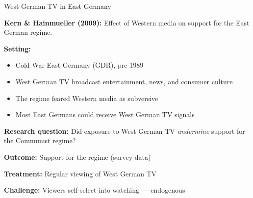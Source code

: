 \documentclass[aspectratio=169, handout]{beamer}
\numberwithin{equation}{section}
\begin{document}
\begin{frame}{West German TV in East Germany}

\textbf{Kern \& Hainmueller (2009):} Effect of Western media on support for the East German regime.

\medskip
\textbf{Setting:}
\begin{itemize}
\item Cold War East Germany (GDR), pre-1989
\item West German TV broadcast entertainment, news, and consumer culture
\item The regime feared Western media as subversive
\item Most East Germans could receive West German TV signals
\end{itemize}

\medskip
\textbf{Research question:} Did exposure to West German TV \textit{undermine} support for the Communist regime?

\medskip
\textbf{Outcome:} Support for the regime (survey data)

\textbf{Treatment:} Regular viewing of West German TV

\textbf{Challenge:} Viewers self-select into watching --- \alert{endogenous}

\end{frame}
\end{document}
